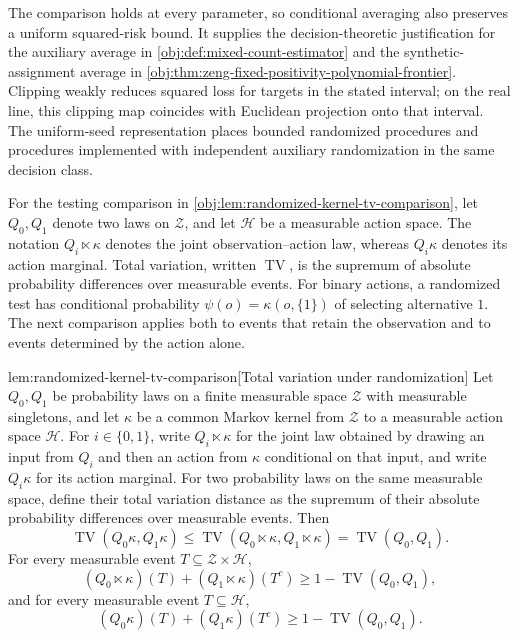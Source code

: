 The comparison holds at every parameter, so conditional averaging also preserves a uniform squared-risk bound. It supplies the decision-theoretic justification for the auxiliary average in \cref{obj:def:mixed-count-estimator} and the synthetic-assignment average in \cref{obj:thm:zeng-fixed-positivity-polynomial-frontier}. Clipping weakly reduces squared loss for targets in the stated interval; on the real line, this clipping map coincides with Euclidean projection onto that interval. The uniform-seed representation places bounded randomized procedures and procedures implemented with independent auxiliary randomization in the same decision class.

For the testing comparison in \cref{obj:lem:randomized-kernel-tv-comparison}, let \(Q_0,Q_1\) denote two laws on \(\mathcal Z\), and let \(\mathcal H\) be a measurable action space. The notation \(Q_i\ltimes\kappa\) denotes the joint observation--action law, whereas \(Q_i\kappa\) denotes its action marginal. Total variation, written \(\operatorname{TV}\), is the supremum of absolute probability differences over measurable events. For binary actions, a randomized test has conditional probability \(\psi(o)=\kappa(o,\{1\})\) of selecting alternative \(1\). The next comparison applies both to events that retain the observation and to events determined by the action alone.

\begin{lemmav}{lem:randomized-kernel-tv-comparison}[Total variation under randomization]
Let \(Q_0,Q_1\) be probability laws on a finite measurable space \(\mathcal Z\) with measurable singletons, and let \(\kappa\) be a common Markov kernel from \(\mathcal Z\) to a measurable action space \(\mathcal H\). For \(i\in\{0,1\}\), write \(Q_i\ltimes\kappa\) for the joint law obtained by drawing an input from \(Q_i\) and then an action from \(\kappa\) conditional on that input, and write \(Q_i\kappa\) for its action marginal. For two probability laws on the same measurable space, define their total variation distance as the supremum of their absolute probability differences over measurable events. Then
\[
\operatorname{TV}(Q_0\kappa,Q_1\kappa)
\le
\operatorname{TV}(Q_0\ltimes\kappa,Q_1\ltimes\kappa)
=
\operatorname{TV}(Q_0,Q_1).
\]
For every measurable event \(T\subseteq\mathcal Z\times\mathcal H\),
\[
(Q_0\ltimes\kappa)(T)+(Q_1\ltimes\kappa)(T^c)
\ge 1-\operatorname{TV}(Q_0,Q_1),
\]
and for every measurable event \(T\subseteq\mathcal H\),
\[
(Q_0\kappa)(T)+(Q_1\kappa)(T^c)
\ge 1-\operatorname{TV}(Q_0,Q_1).
\]
\end{lemmav}

